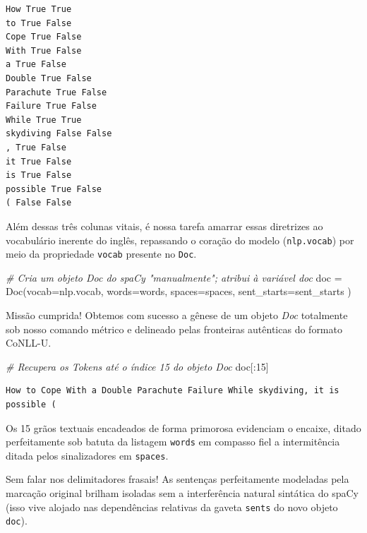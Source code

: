 \documentclass[
  brazilian,
]{article}
\newenvironment{Shaded}{}{}
\newcommand{\CommentTok}[1]{\textcolor[rgb]{0.38,0.63,0.69}{\textit{#1}}}
\newcommand{\DecValTok}[1]{\textcolor[rgb]{0.25,0.63,0.44}{#1}}
\newcommand{\NormalTok}[1]{#1}
\newcommand{\OperatorTok}[1]{\textcolor[rgb]{0.40,0.40,0.40}{#1}}
\begin{document}
\begin{verbatim}
How True True
to True False
Cope True False
With True False
a True False
Double True False
Parachute True False
Failure True False
While True True
skydiving False False
, True False
it True False
is True False
possible True False
( False False
\end{verbatim}

Além dessas três colunas vitais, é nossa tarefa amarrar essas diretrizes
ao vocabulário inerente do inglês, repassando o coração do modelo
(\texttt{nlp.vocab}) por meio da propriedade \texttt{vocab} presente no
\texttt{Doc}.

\begin{Shaded}
\begin{Highlighting}[]
\CommentTok{\# Cria um objeto Doc do spaCy "manualmente"; atribui à variável \textquotesingle{}doc\textquotesingle{}}
\NormalTok{doc }\OperatorTok{=}\NormalTok{ Doc(vocab}\OperatorTok{=}\NormalTok{nlp.vocab, }
\NormalTok{          words}\OperatorTok{=}\NormalTok{words, }
\NormalTok{          spaces}\OperatorTok{=}\NormalTok{spaces,}
\NormalTok{          sent\_starts}\OperatorTok{=}\NormalTok{sent\_starts}
\NormalTok{          )}
\end{Highlighting}
\end{Shaded}

Missão cumprida! Obtemos com sucesso a gênese de um objeto \emph{Doc}
totalmente sob nosso comando métrico e delineado pelas fronteiras
autênticas do formato CoNLL-U.

\begin{Shaded}
\begin{Highlighting}[]
\CommentTok{\# Recupera os Tokens até o índice 15 do objeto Doc}
\NormalTok{doc[:}\DecValTok{15}\NormalTok{]}
\end{Highlighting}
\end{Shaded}

\begin{verbatim}
How to Cope With a Double Parachute Failure While skydiving, it is possible (
\end{verbatim}

Os 15 grãos textuais encadeados de forma primorosa evidenciam o encaixe,
ditado perfeitamente sob batuta da listagem \texttt{words} em compasso
fiel a intermitência ditada pelos sinalizadores em \texttt{spaces}.

Sem falar nos delimitadores frasais! As sentenças perfeitamente
modeladas pela marcação original brilham isoladas sem a interferência
natural sintática do spaCy (isso vive alojado nas dependências relativas
da gaveta \texttt{sents} do novo objeto \texttt{doc}).
\end{document}
